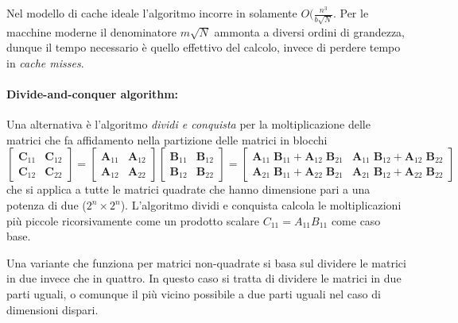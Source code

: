 \documentclass[10pt]{article}
\begin{document}
Nel modello di cache ideale l'algoritmo incorre in solamente $O(\frac{n^3}{b\sqrt{N}}$. Per le macchine moderne il denominatore $m\sqrt{N}$ ammonta a diversi ordini di grandezza, dunque il tempo necessario è quello effettivo del calcolo, invece di perdere tempo in \textit{cache misses}.


\paragraph{Divide-and-conquer algorithm:} Una alternativa è l'algoritmo \textit{dividi e conquista} per la moltiplicazione delle matrici che fa affidamento nella partizione delle matrici in blocchi
\begin{equation}
\begin{bmatrix}
\mathbf{C}_{11} & \mathbf{C}_{12} \\
\mathbf{C}_{12} & \mathbf{C}_{22}
\end{bmatrix} = 
\begin{bmatrix}
\mathbf{A}_{11} & \mathbf{A}_{12} \\
\mathbf{A}_{12} & \mathbf{A}_{22}
\end{bmatrix}
\begin{bmatrix}
\mathbf{B}_{11} & \mathbf{B}_{12} \\
\mathbf{B}_{12} & \mathbf{B}_{22}
\end{bmatrix} = 
\begin{bmatrix}
\mathbf{A}_{11}\;\mathbf{B}_{11}+\mathbf{A}_{12}\;\mathbf{B}_{21} & \mathbf{A}_{11}\;\mathbf{B}_{12}+\mathbf{A}_{12}\;\mathbf{B}_{22} \\
\mathbf{A}_{21}\;\mathbf{B}_{11}+\mathbf{A}_{22}\;\mathbf{B}_{21} & \mathbf{A}_{21}\;\mathbf{B}_{12}+\mathbf{A}_{22}\;\mathbf{B}_{22}
\end{bmatrix}
\end{equation}
che si applica a tutte le matrici quadrate che hanno dimensione pari a una potenza di due (${2^n \times 2^n}$).
L'algoritmo dividi e conquista calcola le moltiplicazioni più piccole ricorsivamente come un prodotto scalare $C_{11} = A_{11}B_{11}$ come caso base.

Una variante che funziona per matrici non-quadrate si basa sul dividere le matrici in due invece che in quattro. In questo caso si tratta di dividere le matrici in due parti uguali, o comunque il più vicino possibile a due parti uguali nel caso di dimensioni dispari.
\end{document}
